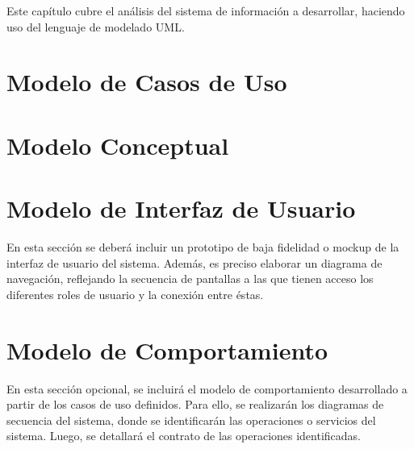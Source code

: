 Este capítulo cubre el análisis del sistema de información a desarrollar, haciendo uso del lenguaje de modelado UML.

\section{Modelo de Casos de Uso}
\label{sec:usecases}


\section{Modelo Conceptual}
\label{sec:conceptualmodel}


\section{Modelo de Interfaz de Usuario}
En esta sección se deberá incluir un prototipo de baja fidelidad o mockup de la interfaz de usuario del sistema. Además, es preciso elaborar un diagrama de navegación, reflejando la secuencia de pantallas a las que tienen acceso los diferentes roles de usuario y la conexión entre éstas.

\section{Modelo de Comportamiento}
En esta sección opcional, se incluirá el modelo de comportamiento desarrollado a partir de los casos de uso definidos. Para ello, se realizarán los diagramas de secuencia del sistema, donde se identificarán las operaciones o servicios del sistema. Luego, se detallará el contrato de las operaciones identificadas.
